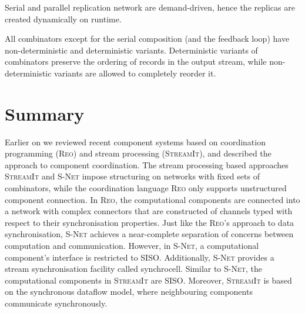 Serial and parallel replication network are demand-driven, hence the replicas are created dynamically on runtime.

All combinators except for the serial composition (and the feedback loop) have non-deterministic and deterministic variants. Deterministic variants of combinators preserve the ordering of records in the output stream, while non-deterministic variants are allowed to completely reorder it.


    \section{Summary}
Earlier on we reviewed recent component systems based on coordination programming (\textsc{Reo}) and stream processing (\textsc{StreamIt}), and described the  approach to component coordination. The stream processing based approaches \textsc{StreamIt} and \textsc{S-Net} impose structuring on networks with fixed sets of combinators, while the coordination language \textsc{Reo} only supports unstructured component connection. In \textsc{Reo}, the computational components are connected into a network with complex connectors that are constructed of channels typed with respect to their synchronisation properties. Just like the \textsc{Reo}'s approach to data synchronisation, \textsc{S-Net} achieves a near-complete separation of concerns between computation and communication. However, in \textsc{S-Net}, a computational component's interface is restricted to SISO. Additionally, \textsc{S-Net} provides a stream synchronisation facility called synchrocell. Similar to \textsc{S-Net}, the computational components in \textsc{StreamIt} are SISO. Moreover, \textsc{StreamIt} is based on the synchronous dataflow model, where neighbouring components communicate synchronously.

